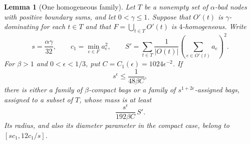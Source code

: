 \documentclass[11pt]{amsart}
\newtheorem{lemma}[theorem]{Lemma}
\theoremstyle{definition}
\theoremstyle{remark}
\numberwithin{equation}{section}
\begin{document}
\begin{lemma}[One homogeneous family]\label{hb:homogeneous-bags}
Let $T$ be a nonempty set of $\alpha$-bad nodes with positive boundary
sums, and let $0<\gamma\le1$.  Suppose that $O'(t)$ is
$\gamma$-dominating for each $t\in T$
and that $F=\bigcup_{t\in T}O'(t)$ is $4$-homogeneous.  Write
\[
 s=\frac{\alpha\gamma}{32},\qquad
 c_1=\min_{e\in F}a_e^2,
 \qquad
 S'=\sum_{t\in T}\frac1{|O(t)|}
                     \left(\sum_{e\in O'(t)}a_e\right)^2.
\]
For $\beta>1$ and $0<\epsilon<1/3$, put
$C=C_1(\epsilon)=1024\epsilon^{-2}$.  If
\begin{equation}\label{hb:smallness}
 s^\epsilon\le\frac1{48\beta C},
\end{equation}
there is either a family of $\beta$-compact bags or a family of
$s^{1+2\epsilon}$-assigned bags, assigned to a subset of $T$, whose
mass is at least
\begin{equation}\label{hb:one-mass}
 \frac{s^\epsilon}{192\beta C}\,S'.
\end{equation}
Its radius, and also its diameter parameter in the compact case,
belong to $[sc_1,12c_1/s]$.
\end{lemma}
\end{document}
